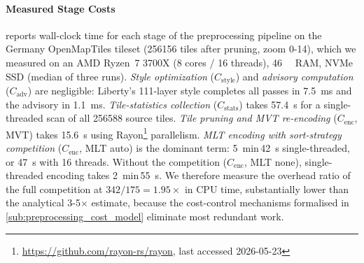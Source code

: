 \paragraph{Measured Stage Costs}
 reports wall-clock time for each stage of the preprocessing pipeline on the Germany OpenMapTiles tileset (\num{256156} tiles after pruning, zoom 0-14), which we measured on an AMD Ryzen~7 3700X (8 cores / 16 threads), \qty{46}{\gibi\byte} \ac{RAM}, NVMe SSD (median of three runs).
\emph{Style optimization} ($C_\text{style}$) and \emph{advisory computation} ($C_\text{adv}$) are negligible: Liberty's 111-layer style completes all passes in \qty{7.5}{\milli\second} and the advisory in \qty{1.1}{\milli\second}.
\emph{Tile-statistics collection} ($C_\text{stats}$) takes \qty{57.4}{\second} for a single-threaded scan of all \num{256588} source tiles.
\emph{Tile pruning and \ac{MVT} re-encoding} ($C_\text{enc}$, MVT) takes \qty{15.6}{\second} using Rayon\footnote{\url{https://github.com/rayon-rs/rayon}, last accessed 2026-05-23} parallelism.
\emph{\ac{MLT} encoding with sort-strategy competition} ($C_\text{enc}$, \ac{MLT} auto) is the dominant term: \qty{5}{\minute}\,\qty{42}{\second} single-threaded, or \qty{47}{\second} with 16 threads.
Without the competition ($C_\text{enc}$, \ac{MLT} none), single-threaded encoding takes \qty{2}{\minute}\,\qty{55}{\second}.
We therefore measure the overhead ratio of the full competition at $342 / 175 = 1.95\times$ in \ac{CPU} time, substantially lower than the analytical 3-5$\times$ estimate, because the cost-control mechanisms formalised in \cref{sub:preprocessing_cost_model} eliminate most redundant work.

